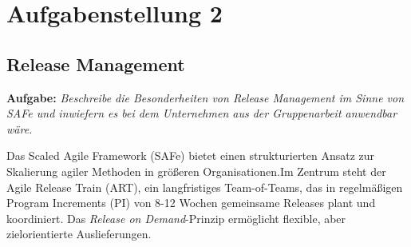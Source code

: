 \newpage
\section{Aufgabenstellung 2}


\subsection{Release Management}
\textbf{Aufgabe:} \textit{Beschreibe die Besonderheiten von Release Management im Sinne von
SAFe und inwiefern es bei dem Unternehmen aus der Gruppenarbeit anwendbar wäre.}

Das Scaled Agile Framework (SAFe) bietet einen strukturierten Ansatz zur Skalierung agiler Methoden
in größeren Organisationen.Im Zentrum steht der Agile Release Train (ART), ein langfristiges
Team-of-Teams, das in regelmäßigen Program Increments (PI) von 8-12 Wochen gemeinsame Releases
plant und koordiniert. Das \textit{Release on Demand}-Prinzip ermöglicht flexible, aber
zielorientierte Auslieferungen.

